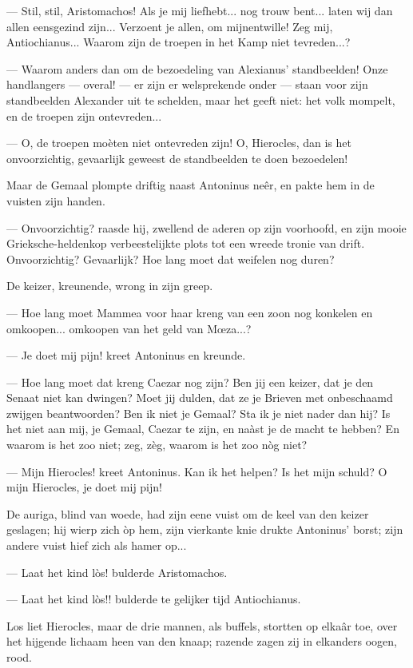 \documentclass[a4paper, 12pt, oneside, dutch]{article}
\begin{document}
--- Stil, stil, Aristomachos! Als je mij liefhebt... nog trouw bent... laten wij dan allen eensgezind zijn... Verzoent je allen, om mijnentwille! Zeg mij, Antiochianus... Waarom zijn de troepen in het Kamp niet tevreden...?

--- Waarom anders dan om de bezoedeling van Alexianus' standbeelden! Onze handlangers --- overal! --- er zijn er welsprekende onder --- staan voor zijn standbeelden Alexander uit te schelden, maar het geeft niet: het volk mompelt, en de troepen zijn ontevreden...

--- O, de troepen moèten niet ontevreden zijn! O, Hierocles, dan is het onvoorzichtig, gevaarlijk geweest de standbeelden te doen bezoedelen!

Maar de Gemaal plompte driftig naast Antoninus neêr, en pakte hem in de vuisten zijn handen.

--- Onvoorzichtig? raasde hij, zwellend de aderen op zijn voorhoofd, en zijn mooie Grieksche-heldenkop verbeestelijkte plots tot een wreede tronie van drift. Onvoorzichtig? Gevaarlijk? Hoe lang moet dat weifelen nog duren?

De keizer, kreunende, wrong in zijn greep.

--- Hoe lang moet Mammea voor haar kreng van een zoon nog konkelen en omkoopen... omkoopen van het geld van Mœza...?

--- Je doet mij pijn! kreet Antoninus en kreunde.

--- Hoe lang moet dat kreng Caezar nog zijn? Ben jij een keizer, dat je den Senaat niet kan dwingen? Moet jij dulden, dat ze je Brieven met onbeschaamd zwijgen beantwoorden? Ben ik niet je Gemaal? Sta ik je niet nader dan hij? Is het niet aan mij, je Gemaal, Caezar te zijn, en naàst je de macht te hebben? En waarom is het zoo niet; zeg, zèg, waarom is het zoo nòg niet?

--- Mijn Hierocles! kreet Antoninus. Kan ik het helpen? Is het mijn schuld? O mijn Hierocles, je doet mij pijn!

De auriga, blind van woede, had zijn eene vuist om de keel van den keizer geslagen; hij wierp zich òp hem, zijn vierkante knie drukte Antoninus' borst; zijn andere vuist hief zich als hamer op...

--- Laat het kind lòs! bulderde Aristomachos.

--- Laat het kind lòs!! bulderde te gelijker tijd Antiochianus.

Los liet Hierocles, maar de drie mannen, als buffels, stortten op elkaâr toe, over het hijgende lichaam heen van den knaap; razende zagen zij in elkanders oogen, rood.
\end{document}
